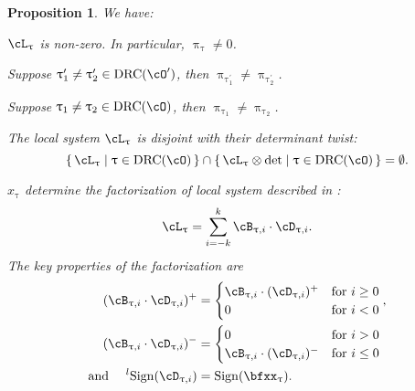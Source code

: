 \documentclass[12pt,a4paper]{amsart}
\newcommand{\bfonepn}{\mathbf{1}^{+,-}}
\def\eDD{\overline{\nabla}}
\numberwithin{equation}{section}
\newtheorem{prop}[thm]{Proposition}
\theoremstyle{remark}
\def\lsign{{}^l\mathrm{Sign}}
\def\ssign{\mathrm{Sign}}
\def\drc{\mathrm{DRC}}
\def\Unip{\mathrm{Unip}}
\def\lUnip{\mathrm{{}^{\ell}Unip}}
\def\cOp{\cO^{\prime}}
\def\uptaup{\uptau^{\prime}}
\begin{document}
\begin{prop}\label{prop:CD}
   We have:
  \begin{enumS}
    \item \label{p:drcls.0} $\cL_{\uptau}$ is non-zero. In particular,
    $\uppi_{\uptau}\neq 0$.
    \item %
    Suppose $\uptaup_{1}\neq \uptaup_{2}\in\drc(\cOp)$, then $\uppi_{\uptaup_{1}}\neq \uppi_{\uptaup_{2}}$.
    \item \label{p:drcls.4}
    Suppose $\uptau_{1}\neq \uptau_{2}\in\drc(\cO)$, then $\uppi_{\uptau_{1}}\neq \uppi_{\uptau_{2}}$.
    \item \label{p:drcls.1}
    The local system $\cL_{\uptau}$ is disjoint with their determinant twist:
    \begin{equation}\label{eq:LS.dis}
      \set{\cL_{\uptau} | \uptau \in \drc(\cO)} \cap \set{\cL_{\uptau}\otimes \det| \uptau\in \drc(\cO)} = \emptyset.
    \end{equation}

    \item  $x_{\uptau}$ determine the factorization of local system described in
    :
    \[
      \cL_{\uptau} = \sum_{i=-k}^{k} \cB_{\uptau,i}\cdot \cD_{\uptau,i}.
    \]
    The key properties of the factorization are
    \begin{equation}\label{eq:bd.prop}
      \begin{split}
        (\cB_{\uptau,i}\cdot\cD_{\uptau,i})^{+} &=
        \begin{cases}
          \cB_{\uptau,i}\cdot (\cD_{\uptau,i})^{+} & \text{for } i \geq 0\\
          0 & \text{for }i < 0\\
        \end{cases}
        ,\\
        (\cB_{\uptau,i}\cdot\cD_{\uptau,i})^{-} &=
        \begin{cases}
          0 &\text{for } i > 0\\
          \cB_{\uptau,i}\cdot (\cD_{\uptau,i})^{-} &\text{for } i \leq 0\\
        \end{cases}\\
        \text{and } \quad \lsign(\cD_{\uptau,i}) & = \ssign(\bfxx_{\uptau}).
      \end{split}
    \end{equation}


\end{enumS}
\end{prop}
\end{document}

